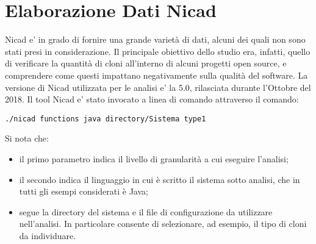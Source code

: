 \section{Elaborazione Dati Nicad}
Nicad e' in grado di fornire una grande varietà di dati, alcuni dei quali non sono stati presi in considerazione. Il principale obiettivo dello studio era, infatti, quello di verificare la quantità di cloni all'interno di alcuni progetti open source, e comprendere come questi impattano negativamente sulla qualità del software.
La versione di Nicad utilizzata per le analisi e' la 5.0, rilasciata durante l'Ottobre del 2018. 
Il tool Nicad e' stato invocato a linea di comando attraverso il comando:
\begin{verbatim}
./nicad functions java directory/Sistema type1
\end{verbatim}
Si nota che:
\begin{itemize}
	\item il primo parametro indica il livello di granularità a cui eseguire l'analisi;
	\item il secondo indica il linguaggio in cui è scritto il sistema sotto analisi, che in tutti gli esempi considerati è Java;
	\item segue la directory del sistema e il file di configurazione da utilizzare nell'analisi. In particolare consente di selezionare, ad esempio, il tipo di cloni da individuare.
\end{itemize}

